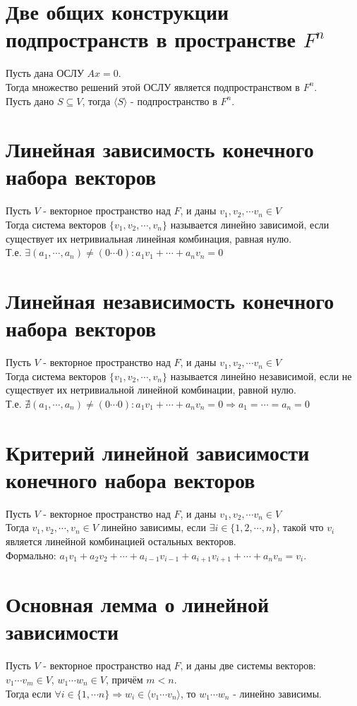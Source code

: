 \documentclass[a4paper,11pt]{report}
\begin{document}
\section{Две общих конструкции подпространств в пространстве $F^n$}
Пусть дана ОСЛУ $Ax = 0$.\\
Тогда множество решений этой ОСЛУ является подпространством в $F^n$.\\
Пусть дано $S \subseteq V$, тогда $\langle S \rangle$ - подпространство в $F^n$.
\section{Линейная зависимость конечного набора векторов}
Пусть $V$ - векторное пространство над $F$, и даны $v_1, v_2, \cdots v_n \in V$\\
Тогда система векторов $\{ v_1, v_2, \cdots, v_n \}$ называется линейно зависимой,
если существует их нетривиальная линейная комбинация, равная нулю.\\
Т.е. $\exists (a_1, \cdots, a_n) \neq (0 \cdots 0): a_1v_1 + \cdots + a_nv_n = 0$\\
\section{Линейная независимость конечного набора векторов}
Пусть $V$ - векторное пространство над $F$, и даны $v_1, v_2, \cdots v_n \in V$\\
Тогда система векторов $\{ v_1, v_2, \cdots, v_n \}$ называется линейно независимой,
если не существует их нетривиальной линейной комбинации, равной нулю.\\
Т.е. $\nexists (a_1, \cdots, a_n) \neq (0 \cdots 0): a_1v_1 + \cdots + a_nv_n = 0 \Rightarrow a_1 = \cdots = a_n = 0$\\
\section{Критерий линейной зависимости конечного набора векторов}
Пусть $V$ - векторное пространство над $F$, и даны $v_1, v_2, \cdots v_n \in V$\\
Тогда $v_1, v_2, \cdots, v_n \in V$ линейно зависимы, если $\exists i \in \{1, 2, \cdots, n\}$, такой что
$v_i$ является линейной комбинацией остальных векторов.\\
Формально: $a_1v_1 + a_2v_2 + \cdots + a_{i-1}v_{i-1} + a_{i+1}v_{i+1} + \cdots + a_nv_n = v_i$.
\section{Основная лемма о линейной зависимости}
Пусть $V$ - векторное пространство над $F$, и даны две системы векторов:\\
$v_1 \cdots v_m \in V$, $w_1 \cdots w_n \in V$, причём $m < n$.\\
Тогда если $\forall i \in \{1, \cdots n\} \Rightarrow w_i \in \langle v_1 \cdots v_n \rangle$, то $w_1 \cdots w_n$ - линейно зависимы.\\
\end{document}
